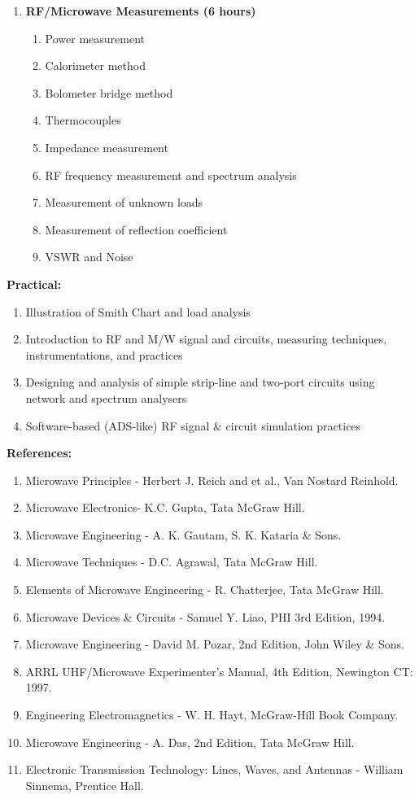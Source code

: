\begin{enumerate}
  \item \textbf{RF/Microwave Measurements \hfill (6 hours)}
    \begin{enumerate}
      \item Power measurement
      \item Calorimeter method
      \item Bolometer bridge method
      \item Thermocouples
      \item Impedance measurement
      \item RF frequency measurement and spectrum analysis
      \item Measurement of unknown loads
      \item Measurement of reflection coefficient
      \item VSWR and Noise
    \end{enumerate}
\end{enumerate}
\Vs

\noindent \textbf{Practical:}
  \begin{enumerate}[label=\arabic*.]
    \item Illustration of Smith Chart and load analysis
    \item Introduction to RF and M/W signal and circuits, measuring techniques, instrumentations, and practices
    \item Designing and analysis of simple strip-line and two-port circuits using network and spectrum analysers
    \item Software-based (ADS-like) RF signal \& circuit simulation practices
  \end{enumerate}
\Vs

\noindent \textbf{References:}
  \begin{enumerate}[label=\arabic*.]
    \item Microwave Principles - Herbert J. Reich and et al., Van Nostard Reinhold.
    \item Microwave Electronics- K.C. Gupta, Tata McGraw Hill.
    \item Microwave Engineering - A. K. Gautam, S. K. Kataria \& Sons.
    \item Microwave Techniques - D.C. Agrawal, Tata McGraw Hill.
    \item Elements of Microwave Engineering - R. Chatterjee, Tata McGraw Hill.
    \item Microwave Devices \& Circuits - Samuel Y. Liao, PHI 3rd Edition, 1994.
    \item Microwave Engineering - David M. Pozar, 2nd Edition, John Wiley \& Sons.
    \item ARRL UHF/Microwave Experimenter's Manual, 4th Edition, Newington CT: 1997.
    \item Engineering Electromagnetics - W. H. Hayt, McGraw-Hill Book Company.
    \item Microwave Engineering - A. Das, 2nd Edition, Tata McGraw Hill.
    \item Electronic Transmission Technology: Lines, Waves, and Antennas - William Sinnema, Prentice Hall.
  \end{enumerate}

\newpage

